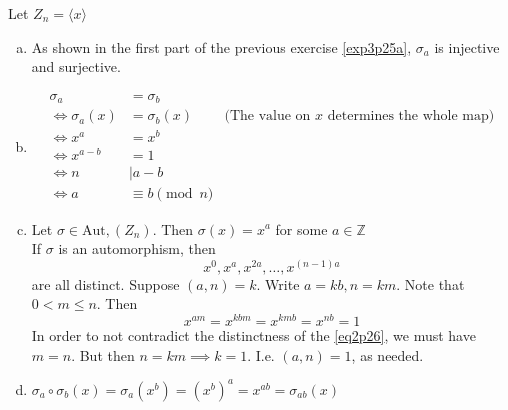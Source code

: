 \documentclass{article}
\newcommand{\ints}{\mathbb{Z}}
\newcommand{\comp}{ \circ }
\newcommand{\Aut}{ \textrm{Aut}, }
\newcommand{\divides}{\big\vert}
\newcommand{\cyclic}[1]{\langle#1\rangle}
\begin{document}
\subsubsection{}\label{ex3p26}
Let $Z_n = \cyclic{x}$
\begin{enumerate}[(a)]
\item As shown in the first part of the previous exercise \ref{exp3p25a}, $\sigma_a$ is injective and surjective.
\item 
\begin{align*}
\sigma_a &= \sigma_b\\
\iff \sigma_a(x) &= \sigma_b(x) & \mbox{(The value on $x$ determines the whole map)}\\
\iff x^a &= x^b\\
\iff x^{a-b} &= 1\\
\iff n &\divides a-b\\
\iff a &\equiv b \pmod{n}
\end{align*}
\item
Let $\sigma \in \Aut(Z_n)$. Then $\sigma(x) = x^a$ for some $a \in \ints$\\
If $\sigma$ is an automorphism, then
\begin{equation}
x^0, x^a, x^{2a},\ldots, x^{(n-1)a} \label{eq2p26}
\end{equation}
are all distinct. Suppose $(a,n)=k$. Write $a=kb,n=km$. Note that $0<m\leq n$. Then\\
\begin{equation}
x^{am} = x^{kbm} = x^{kmb} = x^{nb} = 1
\end{equation}
In order to not contradict the distinctness of the \ref{eq2p26}, we must have $m=n$. But then $n=km \implies k=1$. I.e. $(a,n)=1$, as needed.
\item
$\sigma_a\comp\sigma_b(x) = \sigma_a(x^b) = (x^b)^a = x^{ab} = \sigma_{ab}(x)$
\end{enumerate}
\end{document}
